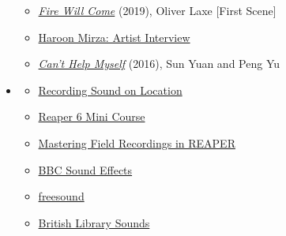\begin{itemize}[noitemsep,topsep=0pt,leftmargin=*]
\begin{itemize}
		      \item \href{https://drive.google.com/drive/folders/1gVKTy4g6NgiLHdrMbCHSF4zTydVyF7jy}{\emph{Fire Will Come}} (2019), Oliver Laxe [First Scene]
		      \item \href{https://www.youtube.com/watch?v=Y8Zpr1ESEO4}{Haroon Mirza: Artist Interview}
		      \item \href{https://www.youtube.com/watch?v=ZS4Bpr2BgnE}{\emph{Can’t Help Myself}} (2016), Sun Yuan and Peng Yu
	      \end{itemize}
	\item {}
	      \begin{resenv}
		      \begin{itemize}
			      \item \href{https://www.youtube.com/watch?v=TKBzjSSaKXU}{Recording Sound on Location}
			      \item \href{https://www.youtube.com/playlist?list=PLM0xHqxaiT6-plorG47t3balft4nVki39}{Reaper 6 Mini Course}
			      \item \href{https://www.youtube.com/watch?v=7BfWqRapF5E}{Mastering Field Recordings in REAPER}
			      \item \href{https://sound-effects.bbcrewind.co.uk/}{BBC Sound Effects}
			      \item \href{https://freesound.org/}{freesound}
			      \item \href{https://sounds.bl.uk/}{British Library Sounds}
		      \end{itemize}
	      \end{resenv}
\end{itemize}
